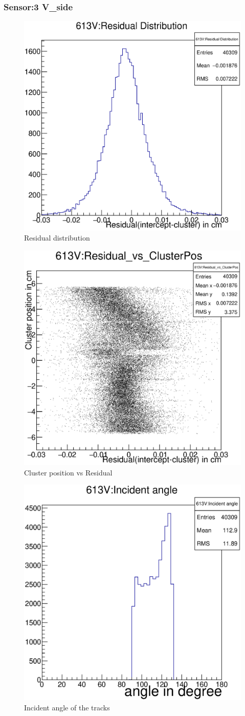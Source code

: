 \documentclass[12pt]{article}
\begin{document}
	\subsubsection{Sensor:3 V\_side}
	\begin{multicols}{3}
		\begin{figure}[H]
			\includegraphics[width=.3\textwidth]{613V:residualplot.eps}	
			\caption{Residual distribution}	
			\label{fig1}	
		\end{figure}
		\begin{figure}[H]
			\includegraphics[width=.3\textwidth]{613V:residual_vs_clusterpos.eps}	
			\caption{Cluster position vs Residual}	
			\label{fig2}	
		\end{figure}
		\begin{figure}[H]
			\includegraphics[width=.3\textwidth]{613V:incident_angle.eps}	
			\caption{Incident angle of the tracks}	
			\label{fig2}	
		\end{figure}
	\end{multicols}
	
\end{document}
